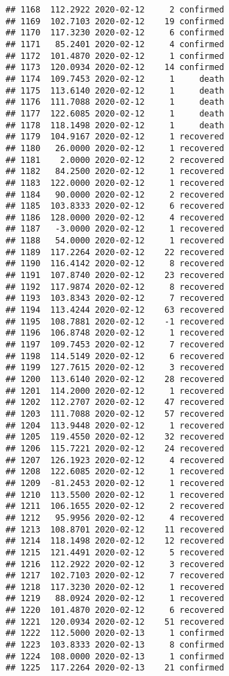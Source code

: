 \documentclass[
]{article}
\begin{document}
\begin{verbatim}
## 1168  112.2922 2020-02-12     2 confirmed
## 1169  102.7103 2020-02-12    19 confirmed
## 1170  117.3230 2020-02-12     6 confirmed
## 1171   85.2401 2020-02-12     4 confirmed
## 1172  101.4870 2020-02-12     1 confirmed
## 1173  120.0934 2020-02-12    14 confirmed
## 1174  109.7453 2020-02-12     1     death
## 1175  113.6140 2020-02-12     1     death
## 1176  111.7088 2020-02-12     1     death
## 1177  122.6085 2020-02-12     1     death
## 1178  118.1498 2020-02-12     1     death
## 1179  104.9167 2020-02-12     1 recovered
## 1180   26.0000 2020-02-12     1 recovered
## 1181    2.0000 2020-02-12     2 recovered
## 1182   84.2500 2020-02-12     1 recovered
## 1183  122.0000 2020-02-12     1 recovered
## 1184   90.0000 2020-02-12     2 recovered
## 1185  103.8333 2020-02-12     6 recovered
## 1186  128.0000 2020-02-12     4 recovered
## 1187   -3.0000 2020-02-12     1 recovered
## 1188   54.0000 2020-02-12     1 recovered
## 1189  117.2264 2020-02-12    22 recovered
## 1190  116.4142 2020-02-12     8 recovered
## 1191  107.8740 2020-02-12    23 recovered
## 1192  117.9874 2020-02-12     8 recovered
## 1193  103.8343 2020-02-12     7 recovered
## 1194  113.4244 2020-02-12    63 recovered
## 1195  108.7881 2020-02-12    -1 recovered
## 1196  106.8748 2020-02-12     1 recovered
## 1197  109.7453 2020-02-12     7 recovered
## 1198  114.5149 2020-02-12     6 recovered
## 1199  127.7615 2020-02-12     3 recovered
## 1200  113.6140 2020-02-12    28 recovered
## 1201  114.2000 2020-02-12     1 recovered
## 1202  112.2707 2020-02-12    47 recovered
## 1203  111.7088 2020-02-12    57 recovered
## 1204  113.9448 2020-02-12     1 recovered
## 1205  119.4550 2020-02-12    32 recovered
## 1206  115.7221 2020-02-12    24 recovered
## 1207  126.1923 2020-02-12     4 recovered
## 1208  122.6085 2020-02-12     1 recovered
## 1209  -81.2453 2020-02-12     1 recovered
## 1210  113.5500 2020-02-12     1 recovered
## 1211  106.1655 2020-02-12     2 recovered
## 1212   95.9956 2020-02-12     4 recovered
## 1213  108.8701 2020-02-12    11 recovered
## 1214  118.1498 2020-02-12    12 recovered
## 1215  121.4491 2020-02-12     5 recovered
## 1216  112.2922 2020-02-12     3 recovered
## 1217  102.7103 2020-02-12     7 recovered
## 1218  117.3230 2020-02-12     1 recovered
## 1219   88.0924 2020-02-12     1 recovered
## 1220  101.4870 2020-02-12     6 recovered
## 1221  120.0934 2020-02-12    51 recovered
## 1222  112.5000 2020-02-13     1 confirmed
## 1223  103.8333 2020-02-13     8 confirmed
## 1224  108.0000 2020-02-13     1 confirmed
## 1225  117.2264 2020-02-13    21 confirmed

\end{verbatim}
\end{document}
